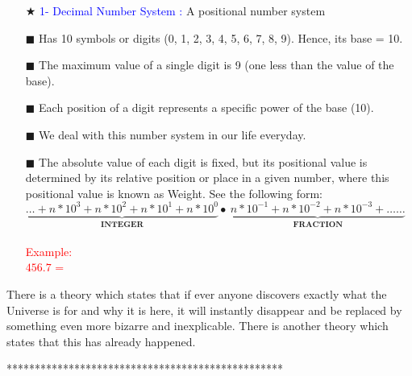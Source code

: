 \documentclass{article}
\begin{document}
\begin{itemize}
\item[$\bigstar$] \textcolor{blue} {1- Decimal Number System :}  A positional number system
\item[$\blacksquare$] Has 10 symbols or digits (0, 1, 2, 3, 4, 5, 6, 7, 8, 9). Hence, its base = 10.
\item[$\blacksquare$] The maximum value of a single digit is 9 (one less than the value of the base).
\item[$\blacksquare$] Each position of a digit represents a specific power of the base (10).
\item[$\blacksquare$] We deal with this number system in our life everyday.
\item[$\blacksquare$] The absolute value of each digit is fixed, but its positional value is determined by its relative position or place in a given number, where this positional value is known as Weight. See the following form:\\

$ \underbrace{…+n* 10^{3} + n* 10^{2} + n* 10^{1} +n* 10^{0}   }_\textbf{INTEGER} \bullet\  \underbrace{n* 10^{-1}+ n*10^{-2}+n* 10^{-3}+……}_\textbf{FRACTION} $\\\\

\textcolor{red} {Example:\\
                $456.7$ = }






\end{itemize}


There is a theory which states that if ever anyone discovers exactly what the Universe is for and why it is here, it will instantly disappear and be replaced by something even more bizarre and inexplicable.
There is another theory which states that this has already happened.

*************************************************


\sectionfont{\fontsize{17}{15}\selectfont}
\setlength{\parskip}{1em}

\setlength{\parindent}{1cm}

\newcommand{\createtitle}[4]{
    {\Huge #1} \hfill  #2 \\
    \-\hfill CMSCXXX
    
    \begin{tabular}{rl}
        \textbf{Assigned: } & #3 \\
        \textbf{Due: } & #4
    \end{tabular}
    \vspace{.75 in}}
\end{document}
